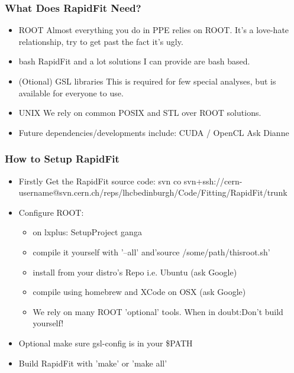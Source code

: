 \documentclass{beamer}
\begin{document}
\begin{frame}
\frametitle{What Does RapidFit Need?}
\begin{itemize}
 \item ROOT\newline
 Almost everything you do in PPE relies on ROOT.\newline
 It's a love-hate relationship, try to get past the fact it's ugly.\newline
 \item bash\newline
 RapidFit and a lot solutions I can provide are bash based.\newline
 \item (Otional) GSL libraries\newline
 This is required for few special analyses, but is available for everyone to use.\newline
 \item UNIX\newline
 We rely on common POSIX and STL over ROOT solutions.\newline
 \item Future dependencies/developments include: CUDA / OpenCL\newline
 Ask Dianne
\end{itemize}
\end{frame}

\begin{frame}
\frametitle{How to Setup RapidFit}
 \begin{itemize}
  \item Firstly Get the RapidFit source code:\newline
  \tiny svn co svn+ssh://cern-username@svn.cern.ch/reps/lhcbedinburgh/Code/Fitting/RapidFit/trunk\normalsize\newline
  \item Configure ROOT:
  \begin{itemize}
   \item on lxplus: SetupProject ganga
   \item compile it yourself with '--all' and\newline 'source /some/path/thisroot.sh'
   \item install from your distro's Repo i.e. Ubuntu (ask Google)
   \item compile using homebrew and XCode on OSX (ask Google)
   \item We rely on many ROOT 'optional' tools. When in doubt:\newline Don't build yourself!\newline
  \end{itemize}
  \item Optional make sure gsl-config is in your \$PATH\newline
  \item Build RapidFit with 'make' or 'make all'
 \end{itemize}
\end{frame}
\end{document}
